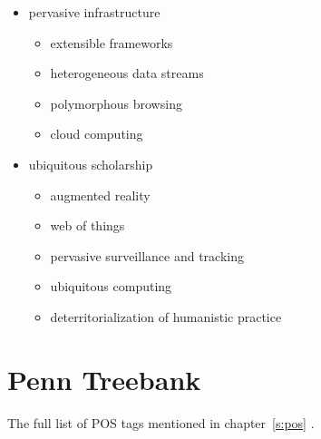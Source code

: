 \begin{multicols}{2}
\begin{itemize}
  \item pervasive infrastructure
  \begin{itemize}
    \item extensible frameworks
    \item	heterogeneous data streams
    \item	polymorphous browsing
    \item	cloud computing
  \end{itemize}
  \item ubiquitous scholarship
  \begin{itemize}
    \item augmented reality
    \item	web of things
    \item	pervasive surveillance and tracking
    \item	ubiquitous computing
    \item	deterritorialization of humanistic practice
  \end{itemize}
\end{itemize}
\end{multicols}

\section{Penn Treebank}
\label{s:penntreebank}

The full list of \ac{POS} tags mentioned in chapter~\ref{s:pos} \autocite{Marcus1993}.

